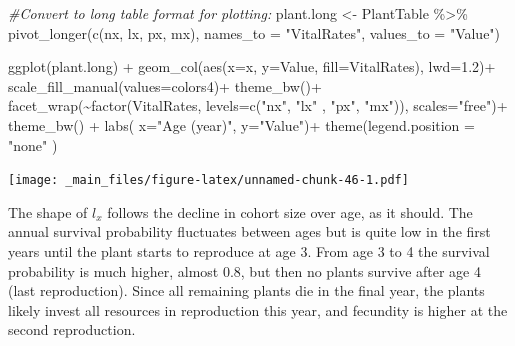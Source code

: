 \documentclass[
]{book}
\newenvironment{Shaded}{\begin{snugshade}}{\end{snugshade}}
\newcommand{\AttributeTok}[1]{\textcolor[rgb]{0.77,0.63,0.00}{#1}}
\newcommand{\CommentTok}[1]{\textcolor[rgb]{0.56,0.35,0.01}{\textit{#1}}}
\newcommand{\FloatTok}[1]{\textcolor[rgb]{0.00,0.00,0.81}{#1}}
\newcommand{\FunctionTok}[1]{\textcolor[rgb]{0.00,0.00,0.00}{#1}}
\newcommand{\NormalTok}[1]{#1}
\newcommand{\OtherTok}[1]{\textcolor[rgb]{0.56,0.35,0.01}{#1}}
\newcommand{\SpecialCharTok}[1]{\textcolor[rgb]{0.00,0.00,0.00}{#1}}
\newcommand{\StringTok}[1]{\textcolor[rgb]{0.31,0.60,0.02}{#1}}
\begin{document}
\begin{Shaded}
\begin{Highlighting}[]
\CommentTok{\#Convert to long table format for plotting:}
\NormalTok{plant.long }\OtherTok{\textless{}{-}}\NormalTok{ PlantTable }\SpecialCharTok{\%\textgreater{}\%} 
  \FunctionTok{pivot\_longer}\NormalTok{(}\FunctionTok{c}\NormalTok{(nx, lx, px,  mx),}
               \AttributeTok{names\_to =} \StringTok{"VitalRates"}\NormalTok{, }
               \AttributeTok{values\_to =} \StringTok{"Value"}\NormalTok{)}
 
\FunctionTok{ggplot}\NormalTok{(plant.long) }\SpecialCharTok{+} 
  \FunctionTok{geom\_col}\NormalTok{(}\FunctionTok{aes}\NormalTok{(}\AttributeTok{x=}\NormalTok{x, }\AttributeTok{y=}\NormalTok{Value, }
               \AttributeTok{fill=}\NormalTok{VitalRates), }\AttributeTok{lwd=}\FloatTok{1.2}\NormalTok{)}\SpecialCharTok{+}
  \FunctionTok{scale\_fill\_manual}\NormalTok{(}\AttributeTok{values=}\NormalTok{colors4)}\SpecialCharTok{+}
  \FunctionTok{theme\_bw}\NormalTok{()}\SpecialCharTok{+}
  \FunctionTok{facet\_wrap}\NormalTok{(}\SpecialCharTok{\textasciitilde{}}\FunctionTok{factor}\NormalTok{(VitalRates,}
                     \AttributeTok{levels=}\FunctionTok{c}\NormalTok{(}\StringTok{"nx"}\NormalTok{, }\StringTok{"lx"}\NormalTok{ , }\StringTok{"px"}\NormalTok{, }\StringTok{"mx"}\NormalTok{)), }
             \AttributeTok{scales=}\StringTok{"free"}\NormalTok{)}\SpecialCharTok{+}
  \FunctionTok{theme\_bw}\NormalTok{() }\SpecialCharTok{+}
  \FunctionTok{labs}\NormalTok{( }\AttributeTok{x=}\StringTok{"Age (year)"}\NormalTok{, }\AttributeTok{y=}\StringTok{"Value"}\NormalTok{)}\SpecialCharTok{+}
  \FunctionTok{theme}\NormalTok{(}\AttributeTok{legend.position =} \StringTok{"none"}\NormalTok{ ) }
\end{Highlighting}
\end{Shaded}

\texttt{[image: \_main\_files/figure-latex/unnamed-chunk-46-1.pdf]}

The shape of \(l_x\) follows the decline in cohort size over age, as it should. The annual survival probability fluctuates between ages but is quite low in the first years until the plant starts to reproduce at age 3. From age 3 to 4 the survival probability is much higher, almost 0.8, but then no plants survive after age 4 (last reproduction). Since all remaining plants die in the final year, the plants likely invest all resources in reproduction this year, and fecundity is higher at the second reproduction.
\end{document}
